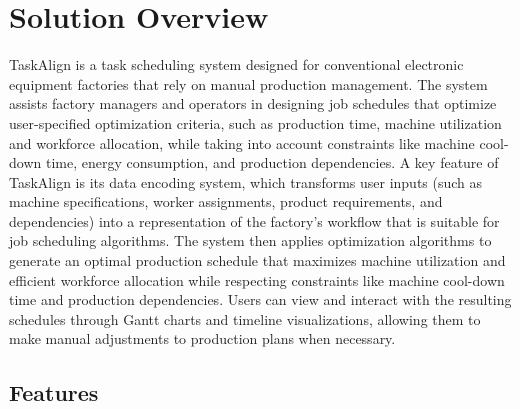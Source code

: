 \section{Solution Overview}
\label{section:solution-overview}

TaskAlign is a task scheduling system designed for conventional electronic equipment factories that rely on manual production management. The system assists factory managers and operators in designing job schedules that optimize user-specified optimization criteria, such as production time, machine utilization and workforce allocation, while taking into account constraints like machine cool-down time, energy consumption, and production dependencies. A key feature of TaskAlign is its data encoding system, which transforms user inputs (such as machine specifications, worker assignments, product requirements, and dependencies) into a representation of the factory's workflow that is suitable for job scheduling algorithms. The system then applies optimization algorithms to generate an optimal production schedule that maximizes machine utilization and efficient workforce allocation while respecting constraints like machine cool-down time and production dependencies. Users can view and interact with the resulting schedules through Gantt charts and timeline visualizations, allowing them to make manual adjustments to production plans when necessary.

\subsection{Features}
\label{subsection:features}

